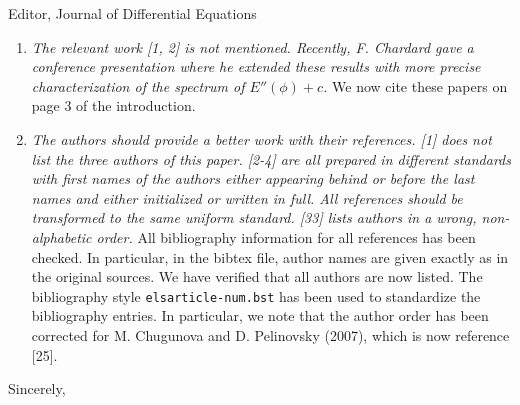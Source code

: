 \documentclass[11pt]{letter}
\begin{document}
\begin{letter}{Editor, Journal of Differential Equations}
\begin{enumerate}
    \item \emph{The relevant work [1, 2] is not mentioned. Recently, F. Chardard gave a conference presentation where he extended these results with more precise characterization of the spectrum of $E''(\phi) + c$.} We now cite these papers on page 3 of the introduction.
    \vspace{4mm}

    \item \emph{The authors should provide a better work with their references. [1] does not list the three authors of this paper. [2-4] are all prepared in different standards with first names of the authors either appearing behind or before the last names and either initialized or written in full. All references should be transformed to the same uniform standard. [33] lists authors in a wrong, non-alphabetic order.} All bibliography information for all references has been checked. In particular, in the bibtex file, author names are given exactly as in the original sources. We have verified that all authors are now listed. The bibliography style \texttt{elsarticle-num.bst} has been used to standardize the bibliography entries. In particular, we note that the author order has been corrected for M. Chugunova and D. Pelinovsky (2007), which is now reference [25].
\end{enumerate}

\closing{Sincerely,}

\end{letter}
\end{document}
